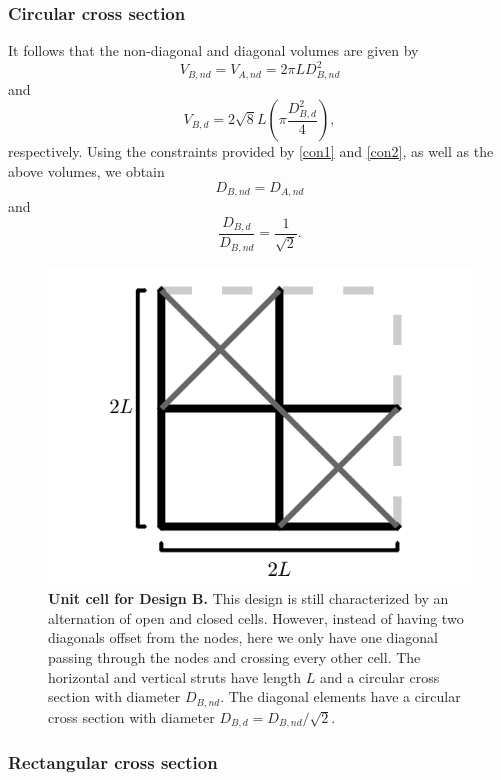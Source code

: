 \documentclass[10pt,twoside]{fernandes_supp}
\begin{document}
\subsubsection{Circular cross section}
It follows that the non-diagonal and diagonal volumes are given by
\begin{equation}
V_{B,nd}=V_{A,nd}=2\pi L D_{B,nd}^2
\end{equation}
and
\begin{equation}
V_{B,d}=2\sqrt{8} L \left(\pi \frac{{D}_{B,d}^2}{4}\right),
\end{equation}
respectively.
Using the constraints provided by \cref{con1} and \cref{con2}, as well as the above volumes, we  obtain 
\begin{equation}
{{D}_{B,nd}}={{D}_{A,nd}}
\end{equation}
and
\begin{equation}
\frac{{D}_{B,d}}{{D}_{B,nd}}=\frac{1}{\sqrt{2}}.
\end{equation}

\begin{figure}[H]
    \centering
    \includegraphics[width=0.45\linewidth]{SFig3.png}
    \caption{{\bf Unit cell for Design B.} This design is still characterized by an alternation of open and closed cells. However, instead of having two  diagonals offset from the nodes, here we only have one diagonal passing through the nodes and crossing every other cell. The horizontal and vertical struts have length $L$ and a circular cross section with diameter $D_{B,nd}$. The diagonal elements have a circular cross section  with diameter $D_{B,d}={D_{B,nd}}/{\sqrt{2}}$.}
    \label{DesignB}
\end{figure}

\subsubsection{Rectangular cross section}
\end{document}
